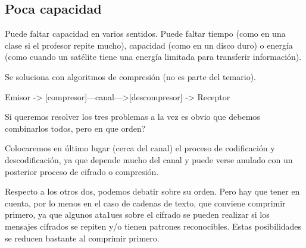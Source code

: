 	\subsection{Poca capacidad}

		Puede faltar capacidad en varios sentidos. Puede faltar tiempo (como en una clase si el profesor repite mucho), capacidad (como en un disco duro) o energía (como cuando un satélite tiene una energía limitada para transferir información).

		Se soluciona con algoritmos de compresión (no es parte del temario).

		Emisor -> [compresor]---canal--->[descompresor] -> Receptor

	\vspace{1cm}


	Si queremos resolver los tres problemas a la vez es obvio que debemos combinarlos todos, pero en que orden?

	Colocaremos en último lugar (cerca del canal) el proceso de codificación y descodificación, ya que depende mucho del canal y puede verse anulado con un posterior proceso de cifrado o compresión.

	Respecto a los otros dos, podemos debatir sobre su orden. Pero hay que tener en cuenta, por lo menos en el caso de cadenas de texto, que conviene comprimir primero, ya que algunos ata1ues sobre el cifrado se pueden realizar si los mensajes cifrados se repiten y/o tienen patrones reconocibles. Estas posibilidades se reducen bastante al comprimir primero.






